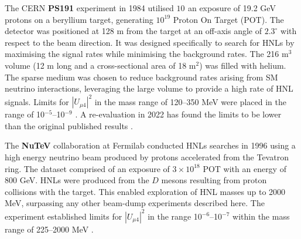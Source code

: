 \begin{coloritemize}
\item The CERN \textbf{PS191} experiment in 1984 utilised $10^{}$ an exposure of 19.2 GeV protons on a beryllium target, generating $10^{19}$ Proton On Target (POT).
The detector was positioned at 128 m from the target at an off-axis angle of $2.3^{\circ}$ with respect to the beam direction.
It was designed specifically to search for HNLs by maximising the signal rates while minimising the background rates.
The 216 m$^{3}$ volume (12 m long and a cross-sectional area of 18 m$^{2}$) was filled with helium.
The sparse medium was chosen to reduce background rates arising from SM neutrino interactions, leveraging the large volume to provide a high rate of HNL signals. 
Limits for $|U_{\mu4}|^{2}$ in the mass range of 120--350 MeV were placed in the range of 10$^{-5}$--10$^{-9}$ \cite{PS191A, PS191B}.
A re-evaluation in 2022 has found the limits to be lower than the original published results \cite{PS191C}.
	

\item The \textbf{NuTeV} collaboration at Fermilab conducted HNLs searches in 1996 using a high energy neutrino beam produced by protons accelerated from the Tevatron ring.
The dataset comprised of an exposure of $3 \times 10^{18}$ POT with an energy of 800 GeV.
HNLs were produced from the $D$ mesons resulting from proton collisions with the target.
This enabled exploration of HNL masses up to 2000 MeV, surpassing any other beam-dump experiments described here.
The experiment established limits for $|U_{\mu4}|^{2}$ in the range 10$^{-6}$--10$^{-7}$ within the mass range of 225--2000 MeV \cite{NuTeV}.


\end{coloritemize}
